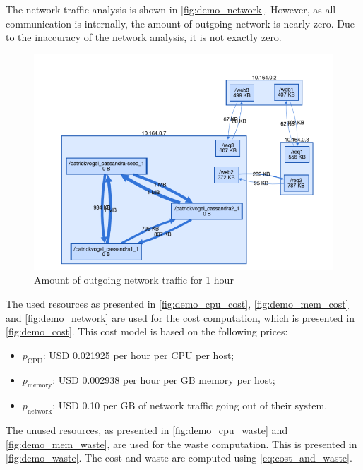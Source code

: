 \noindent
The network traffic analysis is shown in \autoref{fig:demo_network}. However, as all communication is internally, the amount of outgoing network is nearly zero. Due to the inaccuracy of the network analysis, it is not exactly zero.\\

\begin{figure}[H]
    \centering
    \includegraphics[width=\textwidth]{gfx/demo_network}
    \caption{Amount of outgoing network traffic for 1 hour}
    \label{fig:demo_network}
\end{figure}

\noindent
The used resources as presented in \autoref{fig:demo_cpu_cost}, \autoref{fig:demo_mem_cost} and \autoref{fig:demo_network} are used for the cost computation, which is presented in \autoref{fig:demo_cost}. This cost model is based on the following prices:
\begin{itemize}
    \item $p_\text{CPU}$: USD 0.021925 per hour per CPU per host;
    \item $p_\text{memory}$: USD 0.002938 per hour per GB memory per host;
    \item $p_\text{network}$: USD 0.10 per GB of network traffic going out of their system.
\end{itemize}

\noindent
The unused resources, as presented in \autoref{fig:demo_cpu_waste} and \autoref{fig:demo_mem_waste}, are used for the waste computation. This is presented in \autoref{fig:demo_waste}. The cost and waste are computed using \autoref{eq:cost_and_waste}.

